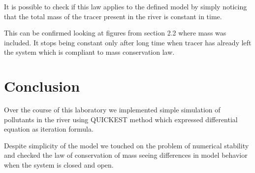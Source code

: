 \documentclass[12pt]{article}
\begin{document}
It is possible to check if this law applies to the defined model by simply noticing that the total mass of the tracer present in the river is constant in time.

This can be confirmed looking at figures from section 2.2 where mass was included. It stops being constant only after long time when tracer has already left the system which is compliant to mass conservation law.

\section{Conclusion}

Over the course of this laboratory we implemented simple simulation of pollutants in the river using QUICKEST method which expressed differential equation as iteration formula.

Despite simplicity of the model we touched on the problem of numerical stability and checked the law of conservation of mass seeing differences in model behavior when the system is closed and open.
\end{document}

